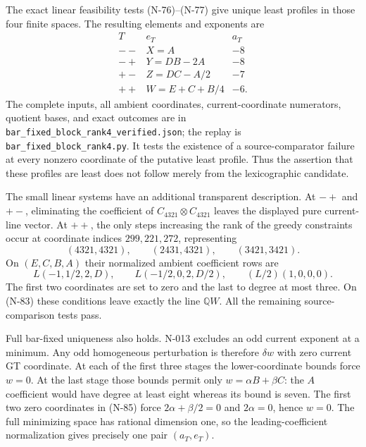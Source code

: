The exact linear feasibility tests (N-76)--(N-77) give unique least
profiles in those four finite spaces.  The resulting elements and
exponents are
\[
 \begin{array}{c|c|r}
 T&e_T&a_T\\\hline
 --&X=A&-8\\
 -+&Y=DB-2A&-8\\
 +-&Z=DC-A/2&-7\\
 ++&W=E+C+B/4&-6.
 \end{array}
 \tag{N-84}
\]
The complete inputs, all ambient coordinates, current-coordinate
numerators, quotient bases, and exact outcomes are in
\nolinkurl{bar_fixed_block_rank4_verified.json}; the replay is
\nolinkurl{bar_fixed_block_rank4.py}.  It tests the existence of a
source-comparator failure at every nonzero coordinate of the putative
least profile.  Thus the assertion that these profiles are least
does not follow merely from the lexicographic candidate.

The small linear systems have an additional transparent description.
At $-+$ and $+-$, eliminating the coefficient of
$C_{4321}\otimes C_{4321}$ leaves the displayed pure current-line
vector.  At $++$, the only steps increasing the rank of the greedy
constraints occur at coordinate indices $299,221,272$, representing
\[
 (4321,4321),\qquad(2431,4321),\qquad(3421,3421).
\]
On $(E,C,B,A)$ their normalized ambient coefficient rows are
\[
 L(-1,1/2,2,D),\qquad
 L(-1/2,0,2,D/2),\qquad
 (L/2)(1,0,0,0).
 \tag{N-85}
\]
The first two coordinates are set to zero and the last to degree
at most three.  On (N-83) these conditions leave exactly the line
$\mathbb QW$.  All the remaining source-comparison tests pass.

Full bar-fixed uniqueness also holds.  N-013 excludes an odd current
exponent at a minimum.  Any odd homogeneous perturbation is therefore
$\delta w$ with zero current GT coordinate.  At each of the first
three stages the lower-coordinate bounds force $w=0$.  At the last
stage those bounds permit only $w=\alpha B+\beta C$: the $A$ coefficient
would have degree at least eight whereas its bound is seven.
The first two zero coordinates in (N-85) force
$2\alpha+\beta/2=0$ and $2\alpha=0$, hence $w=0$.
The full minimizing space has rational dimension one, so the
leading-coefficient normalization gives precisely one pair $(a_T,e_T)$.

